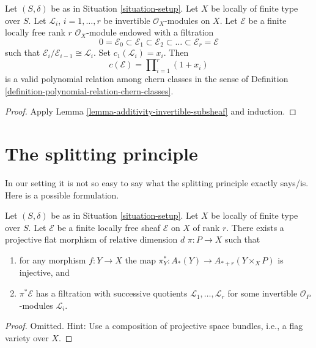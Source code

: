\begin{lemma}
\label{lemma-chern-filter-by-linebundles}
Let $(S, \delta)$ be as in Situation \ref{situation-setup}.
Let $X$ be locally of finite type over $S$.
Let ${\mathcal L}_i$, $i = 1, \ldots, r$ be invertible
$\mathcal{O}_X$-modules on $X$.
Let $\mathcal{E}$ be a finite locally free rank $r$
$\mathcal{O}_X$-module endowed with a filtration
$$
0 = \mathcal{E}_0 \subset \mathcal{E}_1 \subset \mathcal{E}_2
\subset \ldots \subset \mathcal{E}_r = \mathcal{E}
$$
such that $\mathcal{E}_i/\mathcal{E}_{i - 1} \cong \mathcal{L}_i$.
Set $c_1({\mathcal L}_i) = x_i$. Then
$$
c(\mathcal{E})
=
\prod\nolimits_{i = 1}^r (1 + x_i)
$$
is a valid polynomial relation among chern classes in the sense of
Definition \ref{definition-polynomial-relation-chern-classes}.
\end{lemma}

\begin{proof}
Apply Lemma \ref{lemma-additivity-invertible-subsheaf} and induction.
\end{proof}





\section{The splitting principle}
\label{section-splitting-principle}

\noindent
In our setting it is not so easy to say what the splitting principle
exactly says/is. Here is a possible formulation.

\begin{lemma}
\label{lemma-splitting-principle}
Let $(S, \delta)$ be as in Situation \ref{situation-setup}.
Let $X$ be locally of finite type over $S$.
Let $\mathcal{E}$ be a finite locally free sheaf ${\mathcal E}$ on $X$
of rank $r$.
There exists a projective flat morphism of relative dimension $d$
$\pi : P \to X$ such that
\begin{enumerate}
\item for any morphism $f : Y \to X$ the map
$\pi_Y^* : A_*(Y) \to A_{* + r}(Y \times_X P)$ is injective, and
\item $\pi^*{\mathcal E}$ has a filtration
with successive quotients ${\mathcal L}_1, \ldots, {\mathcal L}_r$
for some invertible ${\mathcal O}_P$-modules ${\mathcal L}_i$.
\end{enumerate}
\end{lemma}

\begin{proof}
Omitted. Hint: Use a composition of projective space bundles,
i.e., a flag variety over $X$.
\end{proof}

